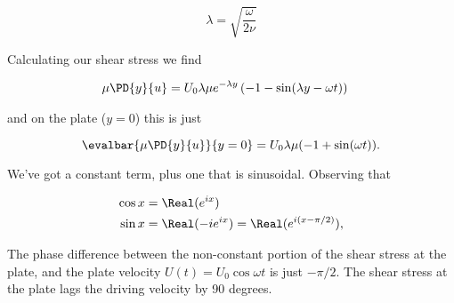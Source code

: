 \begin{equation}\label{eqn:continuumL19:390}
\lambda = \sqrt{\frac{\omega}{2 \nu}}
\end{equation}

Calculating our shear stress we find

\begin{align*}
\mu \PD{y}{u} 
&= U_0 \lambda \mu e^{-\lambda y}
\left(
-1
-
 \sin(\lambda y - \omega t)
\right)
\end{align*}

and on the plate ($y = 0$) this is just

\begin{equation}\label{eqn:continuumL19:410}
\evalbar{\mu \PD{y}{u}}{y = 0} = U_0 \lambda \mu (-1 + \sin(\omega t)).
\end{equation}

We've got a constant term, plus one that is sinusoidal.  Observing that 

\begin{align}\label{eqn:continuumProblemSet3:430}
\cos x &= \Real( e^{ix} )  \\
\sin x &= \Real( -i e^{ix} ) = \Real( e^{i (x - \pi/2)} ),
\end{align}

The phase difference between the non-constant portion of the shear stress at the plate, and the plate velocity $U(t) = U_0 \cos\omega t$ is just $-\pi/2$.  The shear stress at the plate lags the driving velocity by 90 degrees.

\EndArticle
